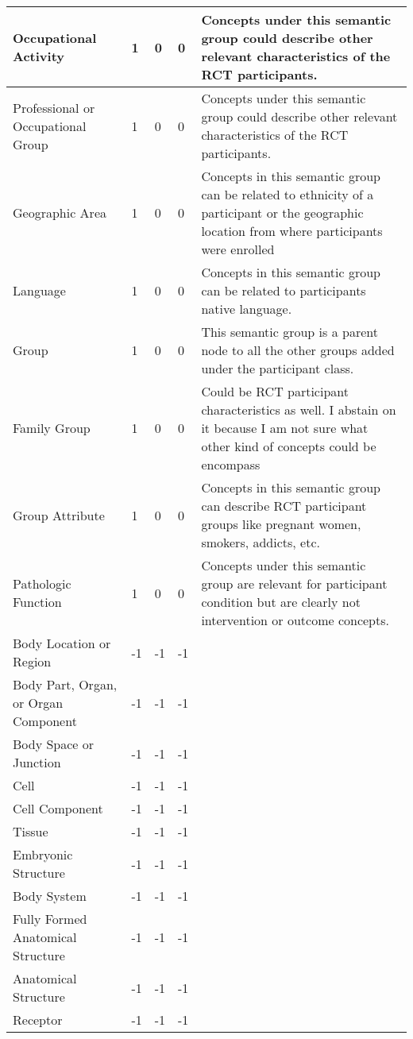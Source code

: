 \documentclass[10.7pt,]{article}
\begin{document}
\begin{longtable}{|l|p{0.3cm}|p{0.3cm}|p{0.3cm}|p{7.9cm}|}
        Occupational Activity & 1 & 0 & 0 & Concepts under this semantic group could describe other relevant characteristics of the RCT participants. \\ \hline
        Professional or Occupational Group & 1 & 0 & 0 & Concepts under this semantic group could describe other relevant characteristics of the RCT participants. \\ \hline
        Geographic Area & 1 & 0 & 0 & Concepts in this semantic group can be related to ethnicity of a participant or the geographic location from where participants were enrolled \\ \hline
        Language & 1 & 0 & 0 & Concepts in this semantic group can be related to participants native language. \\ \hline
        Group & 1 & 0 & 0 & This semantic group is a parent node to all the other groups added under the participant class. \\ \hline
        Family Group & 1 & 0 & 0 & Could be RCT participant characteristics as well. I abstain on it because I am not sure what other kind of concepts could be encompass \\ \hline
        Group Attribute & 1 & 0 & 0 & Concepts in this semantic group can describe RCT participant groups like pregnant women, smokers, addicts, etc. \\ \hline
        Pathologic Function & 1 & 0 & 0 & Concepts under this semantic group are relevant for participant condition but are clearly not intervention or outcome concepts. \\ \hline
        Body Location or Region & -1 & -1 & -1 & ~ \\ \hline
        Body Part, Organ, or Organ Component & -1 & -1 & -1 & ~ \\ \hline
        Body Space or Junction & -1 & -1 & -1 & ~ \\ \hline
        Cell & -1 & -1 & -1 & ~ \\ \hline
        Cell Component & -1 & -1 & -1 & ~ \\ \hline
        Tissue & -1 & -1 & -1 & ~ \\ \hline
        Embryonic Structure & -1 & -1 & -1 & ~ \\ \hline
        Body System & -1 & -1 & -1 & ~ \\ \hline
        Fully Formed Anatomical Structure & -1 & -1 & -1 & ~ \\ \hline
        Anatomical Structure & -1 & -1 & -1 & ~ \\ \hline
        Receptor & -1 & -1 & -1 & ~ \\ \hline

\end{longtable}
\end{document}
